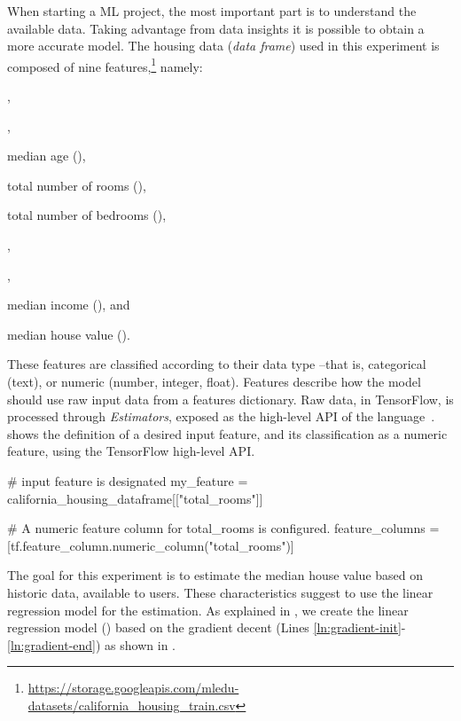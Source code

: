 When starting a \ac{ML} project, the most important part is to understand the available data.
Taking advantage from data insights it is possible to obtain a more accurate model. The housing data 
(\ie \emph{data frame}) used in this experiment is composed of nine features,\footnote{\url{https://storage.googleapis.com/mledu-datasets/california_housing_train.csv}} namely: 
\begin{enumerate*}[label=(\arabic*)]
\item {},
\item {},
\item median age (),	
\item total number of rooms (),	
\item total number of bedrooms (),
\item {},	
\item {},
\item median income (), and
\item	median house value ().
\end{enumerate*}
These features are classified according to their data type --that is, categorical (\eg text), or numeric 
(\eg number, integer, float). Features describe how the model should use raw input data from a 
features dictionary. Raw data, in TensorFlow, is processed through \emph{Estimators}, exposed as 
the high-level API of the language~\cite{tensor18}.  shows the definition 
of a desired input feature, and its classification as a numeric feature, using the TensorFlow high-level 
API.

\begin{tensorflow}[
	label={lst:feature-configuration},
	caption={Feature definition and classification}]
 # input feature is designated
 my_feature = california_housing_dataframe[["total_rooms"]]

 # A numeric feature column for total_rooms is configured.
 feature_columns = [tf.feature_column.numeric_column("total_rooms")]
\end{tensorflow}

The goal for this experiment is to estimate the median house value based on historic data, available to 
users. These characteristics suggest to use the linear regression model for the estimation.
As explained in , we create the linear regression model 
() based on the gradient  decent (Lines \ref{ln:gradient-init}-\ref{ln:gradient-end}) as 
shown in .

